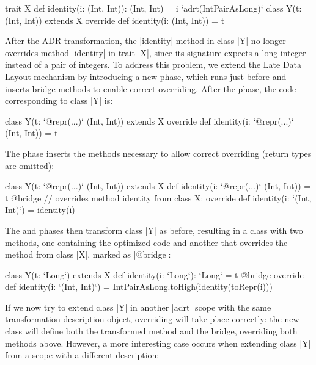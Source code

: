 \begin{lstlisting-nobreak}
trait X {
  def identity(i: (Int, Int)): (Int, Int) = i
}
`adrt(IntPairAsLong)` {
  class Y(t: (Int, Int)) extends X {
    override def identity(i: (Int, Int)) = t
  }
}
\end{lstlisting-nobreak}

After the ADR transformation, the |identity| method in class |Y| no longer overrides method |identity| in trait |X|, since its signature expects a long integer instead of a pair of integers. To address this problem, we extend the Late Data Layout mechanism by introducing a new \bridge{} phase, which runs just before \coerce{} and inserts bridge methods to enable correct overriding. After the \inject{} phase, the code corresponding to class |Y| is:

\begin{lstlisting-nobreak}
class Y(t: `@repr(...)` (Int, Int)) extends X {
  override def identity(i: `@repr(...)` (Int, Int)) = t
}
\end{lstlisting-nobreak}

The \bridge{} phase inserts the methods necessary to allow correct overriding (return types are omitted):

\begin{lstlisting-nobreak}
class Y(t: `@repr(...)` (Int, Int)) extends X {
  def identity(i: `@repr(...)` (Int, Int)) = t
  @bridge // overrides method identity from class X:
  override def identity(i: `(Int, Int)`) = identity(i)
}
\end{lstlisting-nobreak}

The \coerce{} and \commit{} phases then transform class |Y| as before, resulting in a class with two methods, one containing the optimized code and another that overrides the method from class |X|, marked as |@bridge|:

\begin{lstlisting-nobreak}
class Y(t: `Long`) extends X {
  def identity(i: `Long`): `Long` = t
  @bridge override def identity(i: `(Int, Int)`) =
    IntPairAsLong.toHigh(identity(toRepr(i)))
}
\end{lstlisting-nobreak}

If we now try to extend class |Y| in another |adrt| scope with the same transformation description object, overriding will take place correctly: the new class will define both the transformed method and the bridge, overriding both methods above. However, a more interesting case occurs when extending class |Y| from a scope with a different description:

